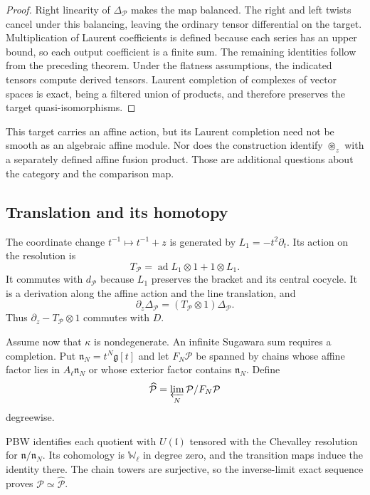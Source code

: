 \begin{proof}
Right linearity of $\Delta_{\mathcal P}$ makes the map balanced.
The right and left twists cancel under this balancing, leaving
the ordinary tensor differential on the target. Multiplication
of Laurent coefficients is defined because each series has an
upper bound, so each output coefficient is a finite sum.
The remaining identities follow from the preceding theorem.
Under the flatness assumptions, the indicated tensors compute
derived tensors. Laurent completion of complexes of vector spaces
is exact, being a filtered union of products, and therefore
preserves the target quasi-isomorphisms.
\end{proof}

This target carries an affine action, but its Laurent completion
need not be smooth as an algebraic affine module. Nor does the
construction identify $\circledast_z$ with a separately defined
affine fusion product. Those are additional questions about the
category and the comparison map.

\subsection{Translation and its homotopy}

The coordinate change $t^{-1}\mapsto t^{-1}+z$ is generated by
$L_1=-t^2\partial_t$. Its action on the resolution is
\[
 T_{\mathcal P}=\operatorname{ad}L_1\otimes1+1\otimes L_1.
\]
It commutes with $d_{\mathcal P}$ because $L_1$ preserves the
bracket and its central cocycle. It is a derivation along the
affine action and the line translation, and
\begin{equation}\label{cyrec:eq:resolution-horizontal}
 \partial_z\Delta_{\mathcal P}
                     =(T_{\mathcal P}\otimes1)\Delta_{\mathcal P}.
\end{equation}
Thus $\partial_z-T_{\mathcal P}\otimes1$ commutes with $D$.

Assume now that $\kappa$ is nondegenerate. An infinite
Sugawara sum requires a completion. Put
$\mathfrak n_N=t^N\mathfrak g[t]$ and let $F_N\mathcal P$
be spanned by chains whose affine factor lies in
$A_\ell\mathfrak n_N$ or whose exterior factor contains
$\mathfrak n_N$. Define
\[
 \widehat{\mathcal P}=\varprojlim_N\mathcal P/F_N\mathcal P
\]
degreewise.

PBW identifies each quotient with
$U(\mathfrak l)$ tensored with the Chevalley resolution for
$\mathfrak n/\mathfrak n_N$. Its cohomology is
$\mathbb W_\ell$ in degree zero, and the transition maps induce
the identity there. The chain towers are surjective, so the
inverse-limit exact sequence proves
$\mathcal P\simeq\widehat{\mathcal P}$.


